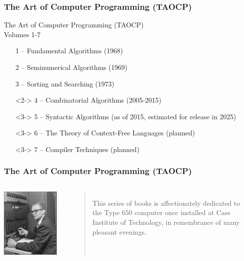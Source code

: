 \documentclass[10pt]{beamer}
\begin{document}
\begin{frame}[fragile]
  \frametitle{The Art of Computer Programming (TAOCP)}
  \begin{block}{The Art of Computer Programming (TAOCP)\\Volumes 1-7\\}
    \begin{itemize}
          \item[] 1 – Fundamental Algorithms (1968)
          \item[] 2 – Seminumerical Algorithms (1969)
          \item[] 3 – Sorting and Searching (1973)
          \item[]<2-> 4 – Combinatorial Algorithms (2005-2015)
          \item[]<3-> 5 – Syntactic Algorithms (as of 2015, estimated for release in 2025)
          \item[]<3-> 6 – The Theory of Context-Free Languages (planned)
          \item[]<3-> 7 – Compiler Techniques (planned)
    \end{itemize}
  \end{block}
\end{frame}

\begin{frame}
  \frametitle{The Art of Computer Programming (TAOCP)}
  \begin{columns}[c]
      \includegraphics[width=0.9\textwidth]{./media/Don-Knuth-ibm-650-1958.jpg}
        \begin{quote}
This series of books is affectionately dedicated to the Type 650 computer once installed at Case Institute of Technology, in remembrance of many pleasant evenings.
        \end{quote}
        \cite{Knuth1973Art}
  \end{columns}
\end{frame}
\end{document}
